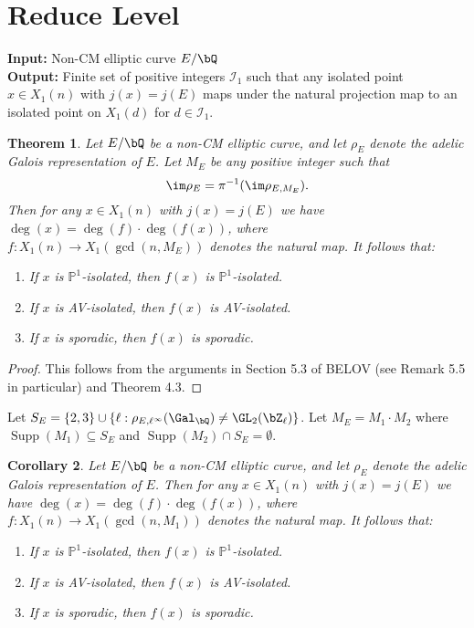 \documentclass[11pt,reqno]{amsart}
\theoremstyle{plain}
\newtheorem{theorem}{Theorem}%
\newtheorem{corollary}[theorem]{Corollary}
\theoremstyle{definition}
\newcommand{\Supp}{\operatorname{Supp}}
\newcommand{\Q}{\bQ}
\newcommand{\Z}{\bZ}
\begin{document}
\section{Reduce Level}
\noindent \textbf{Input:} Non-CM elliptic curve $E/\Q$\\
\textbf{Output:} Finite set of positive integers $\mathcal{I}_1$ such that any isolated point $x \in X_1(n)$ with $j(x) =j(E)$ maps under the natural projection map to an isolated point on $X_1(d)$ for $d \in \mathcal{I}_1$.
\begin{theorem}
Let $E/\Q$ be a non-CM elliptic curve, and let $\rho_E$ denote the adelic Galois representation of $E$. Let $M_E$ be any positive integer such that 
\[
\im \rho_E=\pi^{-1}(\im \rho_{E, M_E}).
\]
Then for any $x \in X_1(n)$ with $j(x)=j(E)$ we have $\deg(x)=\deg(f)\cdot \deg(f(x))$, where $f: X_1(n) \rightarrow X_1(\gcd(n,M_E))$ denotes the natural map. It follows that:
\begin{enumerate}
\item If $x$ is $\mathbb{P}^1$-isolated, then $f(x)$ is $\mathbb{P}^1$-isolated.
\item If $x$ is AV-isolated, then $f(x)$ is AV-isolated.
\item If $x$ is sporadic, then $f(x)$ is sporadic.
\end{enumerate}
\end{theorem}

\begin{proof}
This follows from the arguments in Section 5.3 of BELOV (see Remark 5.5 in particular) and Theorem 4.3.
\end{proof}

Let $S_E=\{2,3\} \cup \{\ell : \rho_{E,\ell^{\infty}}(\Gal_{\Q}) \neq \GL_2(\Z_{\ell})\}$. Let $M_E=M_1\cdot M_2$ where $\Supp(M_1) \subseteq S_E$ and $\Supp(M_2) \cap S_E =\emptyset$.

\begin{corollary}
Let $E/\Q$ be a non-CM elliptic curve, and let $\rho_E$ denote the adelic Galois representation of $E$. 
Then for any $x \in X_1(n)$ with $j(x)=j(E)$ we have $\deg(x)=\deg(f)\cdot \deg(f(x))$, where $f: X_1(n) \rightarrow X_1(\gcd(n,M_1))$ denotes the natural map. It follows that:
\begin{enumerate}
\item If $x$ is $\mathbb{P}^1$-isolated, then $f(x)$ is $\mathbb{P}^1$-isolated.
\item If $x$ is AV-isolated, then $f(x)$ is AV-isolated.
\item If $x$ is sporadic, then $f(x)$ is sporadic.
\end{enumerate}
\end{corollary}
\end{document}
